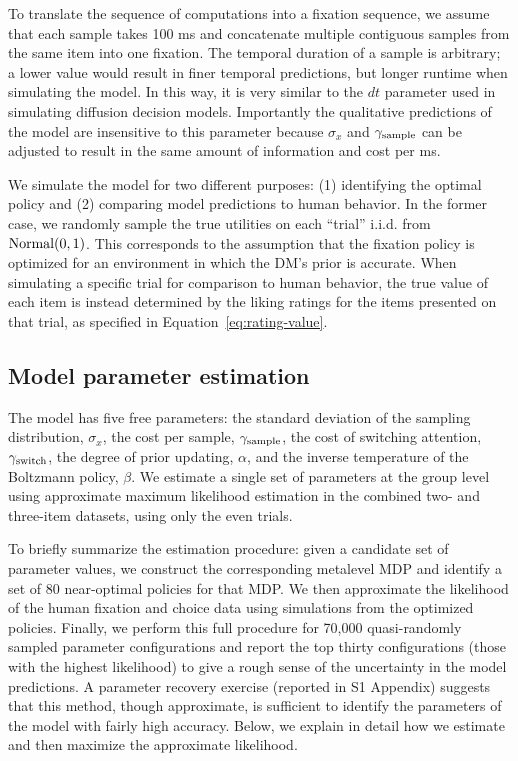 To translate the sequence of computations into a fixation sequence, we assume that each sample takes 100 ms and concatenate multiple contiguous samples from the same item into one fixation. The temporal duration of a sample is arbitrary; a lower value would result in finer temporal predictions, but longer runtime when simulating the model. In this way, it is very similar to the $dt$ parameter used in simulating diffusion decision models. Importantly the qualitative predictions of the model are insensitive to this parameter because $\sigma_x$ and $\gamma_\text{sample}$ can be adjusted to result in the same amount of information and cost per ms. 

We simulate the model for two different purposes: (1) identifying the optimal policy and (2) comparing model predictions to human behavior. In the former case, we randomly sample the true utilities on each ``trial'' i.i.d. from $\mathrm{Normal}(0,1)$. This corresponds to the assumption that the fixation policy is optimized for an environment in which the DM's prior is accurate. When simulating a specific trial for comparison to human behavior, the true value of each item is instead determined by the liking ratings for the items presented on that trial, as specified in Equation~\ref{eq:rating-value}.


\subsection{Model parameter estimation}

The model has five free parameters: the standard deviation of the sampling distribution, $\sigma_{x}$, the cost per sample, $\gamma_\text{sample}$, the cost of switching attention, $\gamma_\text{switch}$, the degree of prior updating, $\alpha$, and the inverse temperature of the Boltzmann policy, $\beta$. We estimate a single set of parameters at the group level using approximate maximum likelihood estimation in the combined two- and three-item datasets, using only the even trials.

To briefly summarize the estimation procedure: given a candidate set of parameter values, we construct the corresponding metalevel MDP and identify a set of 80 near-optimal policies for that MDP. We then approximate the likelihood of the human fixation and choice data using simulations from the optimized policies. Finally, we perform this full procedure for 70,000 quasi-randomly sampled parameter configurations and report the top thirty configurations (those with the highest likelihood) to give a rough sense of the uncertainty in the model predictions. A parameter recovery exercise (reported in S1 Appendix) suggests that this method, though approximate, is sufficient to identify the parameters of the model with fairly high accuracy. Below, we explain in detail how we estimate and then maximize the approximate likelihood.

